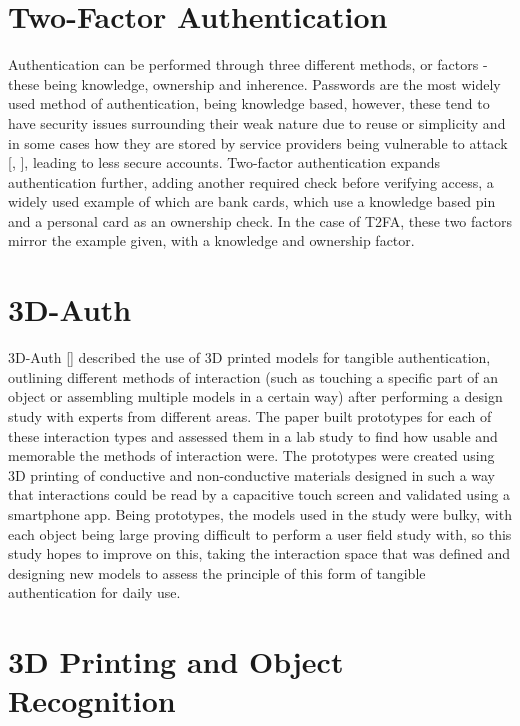 \documentclass{l4proj}
\begin{document}
\section{Two-Factor Authentication}

Authentication can be performed through three different methods, or factors - these being knowledge, ownership and inherence. Passwords are the most widely used method of authentication, being knowledge based, however, these tend to have security issues surrounding their weak nature due to reuse or simplicity and in some cases how they are stored by service providers being vulnerable to attack [\cite{10.5555/3235838.3235860}, \cite{10.5555/3235866.3235877}], leading to less secure accounts. Two-factor authentication expands authentication further, adding another required check before verifying access, a widely used example of which are bank cards, which use a knowledge based pin and a personal card as an ownership check. In the case of T2FA, these two factors mirror the example given, with a knowledge and ownership factor.

\section{3D-Auth}

3D-Auth [\cite{marky20203d}] described the use of 3D printed models for tangible authentication, outlining different methods of interaction (such as touching a specific part of an object or assembling multiple models in a certain way) after performing a design study with experts from different areas. The paper built prototypes for each of these interaction types and assessed them in a lab study to find how usable and memorable the methods of interaction were. The prototypes were created using 3D printing of conductive and non-conductive materials designed in such a way that interactions could be read by a capacitive touch screen and validated using a smartphone app. Being prototypes, the models used in the study were bulky, with each object being large proving difficult to perform a user field study with, so this study hopes to improve on this, taking the interaction space that was defined and designing new models to assess the principle of this form of tangible authentication for daily use. 

\section{3D Printing and Object Recognition}
\end{document}
